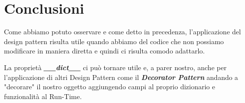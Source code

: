 \chapter{Conclusioni}

Come abbiamo potuto osservare e come detto in precedenza, l'applicazione del
design pattern risulta utile quando abbiamo del codice che non possiamo modificare in maniera
diretta e quindi ci risulta comodo adattarlo.

La proprietà \textbf{\textit{\_\_dict\_\_}} ci può tornare utile e, a parer nostro,
anche per l'applicazione di altri Design Pattern come il \textbf{\textit{Decorator Pattern}}
andando a "decorare" il nostro oggetto aggiungendo campi al proprio dizionario
e funzionalità al Run-Time.